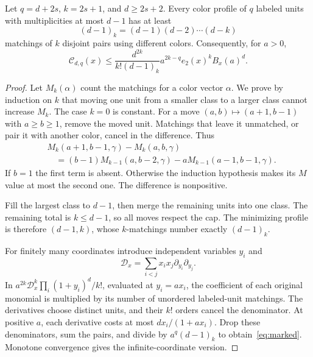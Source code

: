 \documentclass[11pt,a4paper]{article}
\theoremstyle{remark}\newtheorem*{ednote}{Editorial note (ProveIt, 2026-10-01)}
\begin{document}
\begin{lemma}\label{lem:matching}
Let $q=d+2s$, $k=2s+1$, and $d\ge2s+2$. Every color profile of $q$ labeled units with multiplicities at most $d-1$ has at least
\[
(d-1)_k=(d-1)(d-2)\cdots(d-k)
\]
matchings of $k$ disjoint pairs using different colors. Consequently, for $a>0$,
\begin{equation}\label{eq:marked}
\mathcal C_{d,q}(x)\le
\frac{d^{2k}}{k!(d-1)_k}a^{2k-q}e_2(x)^kB_x(a)^d.
\end{equation}
\end{lemma}
\begin{proof}
Let $M_k(\alpha)$ count the matchings for a color vector $\alpha$. We prove by induction on $k$ that moving one unit from a smaller class to a larger class cannot increase $M_k$. The case $k=0$ is constant. For a move $(a,b)\mapsto(a+1,b-1)$ with $a\ge b\ge1$, remove the moved unit. Matchings that leave it unmatched, or pair it with another color, cancel in the difference. Thus
\begin{align*}
&M_k(a+1,b-1,\gamma)-M_k(a,b,\gamma)\\
&\quad=(b-1)M_{k-1}(a,b-2,\gamma)-aM_{k-1}(a-1,b-1,\gamma).
\end{align*}
If $b=1$ the first term is absent. Otherwise the induction hypothesis makes its $M$ value at most the second one. The difference is nonpositive.

Fill the largest class to $d-1$, then merge the remaining units into one class. The remaining total is $k\le d-1$, so all moves respect the cap. The minimizing profile is therefore $(d-1,k)$, whose $k$-matchings number exactly $(d-1)_k$.

For finitely many coordinates introduce independent variables $y_i$ and
\[
\mathcal D_x=\sum_{i<j}x_ix_j\partial_{y_i}\partial_{y_j}.
\]
In $a^{2k}\mathcal D_x^k\prod_i(1+y_i)^d/k!$, evaluated at $y_i=ax_i$, the coefficient of each original monomial is multiplied by its number of unordered labeled-unit matchings. The derivatives choose distinct units, and their $k!$ orders cancel the denominator. At positive $a$, each derivative costs at most $d x_i/(1+ax_i)$. Drop these denominators, sum the pairs, and divide by $a^q(d-1)_k$ to obtain~\eqref{eq:marked}. Monotone convergence gives the infinite-coordinate version.
\end{proof}
\end{document}
